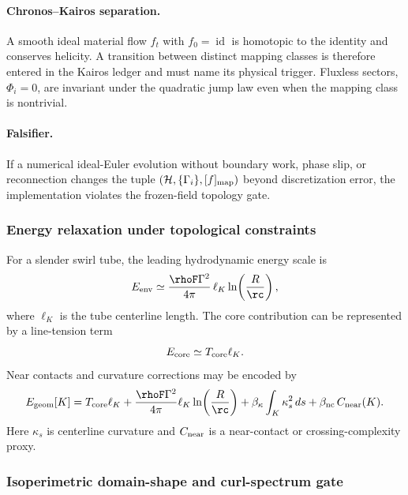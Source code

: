 \paragraph{Chronos--Kairos separation.}
A smooth ideal material flow $f_t$ with $f_0=\operatorname{id}$ is homotopic to
the identity and conserves helicity.  A transition between distinct mapping
classes is therefore entered in the Kairos ledger and must name its physical
trigger.  Fluxless sectors, $\Phi_i=0$, are invariant under the quadratic jump
law even when the mapping class is nontrivial.

\paragraph{Falsifier.}
If a numerical ideal-Euler evolution without boundary work, phase slip, or
reconnection changes the tuple
$\left(\mathcal H,\{\Gamma_i\},[f]_{\rm map}\right)$ beyond discretization
error, the implementation violates the frozen-field topology gate.

\subsubsection{Energy relaxation under topological constraints}
For a slender swirl tube, the leading hydrodynamic energy scale is
\begin{equation}
    E_{\rm env}
    \simeq
    \frac{\rhoF\Gamma^2}{4\pi}\,\ell_K\ln\!\left(\frac{R}{\rc}\right),
    \label{eq:env_energy_tfm}
\end{equation}
where $\ell_K$ is the tube centerline length. The core contribution can be represented by a line-tension term
\begin{equation}
    E_{\rm core}\simeq T_{\rm core}\ell_K.
    \label{eq:core_line_tension}
\end{equation}
Near contacts and curvature corrections may be encoded by
\begin{equation}
    E_{\rm geom}[K]
    =T_{\rm core}\ell_K
    +\frac{\rhoF\Gamma^2}{4\pi}\ell_K\ln\!\left(\frac{R}{\rc}\right)
    +\beta_{\kappa}\int_K \kappa_s^2\,ds
    +\beta_{\rm nc}\,C_{\rm near}(K).
    \label{eq:geometric_energy_functional}
\end{equation}
Here $\kappa_s$ is centerline curvature and $C_{\rm near}$ is a near-contact or crossing-complexity proxy.

\subsubsection{Isoperimetric domain-shape and curl-spectrum gate}
\label{subsubsec:rt_isoperimetric_domain_shape}
